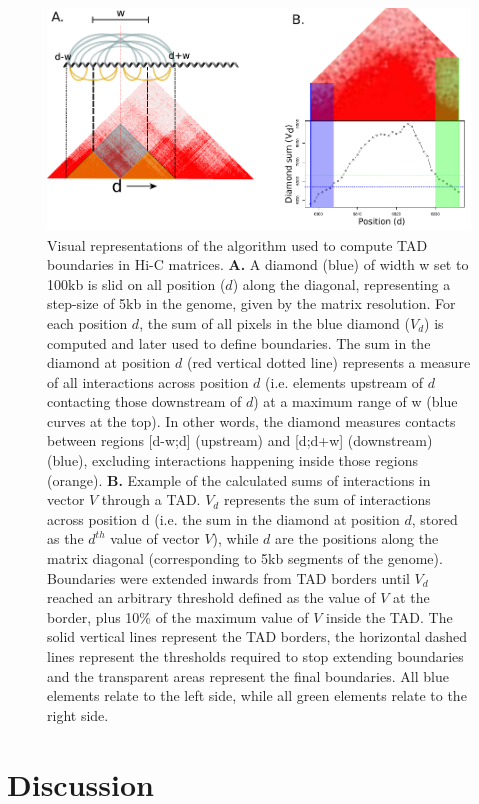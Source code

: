 \documentclass[11pt,a4paper]{report}
\begin{document}
\begin{figure}[ht]
	\includegraphics[width=1\textwidth]{Figures/6_interactions.pdf}
	\caption{Visual representations of the algorithm used to compute TAD boundaries in Hi-C matrices. \textbf{A.} A diamond (blue) of width w set to 100kb is slid on all position ($d$) along the diagonal, representing a step-size of 5kb in the genome, given by the matrix resolution. For each position $d$, the sum of all pixels in the blue diamond ($V_d$) is computed and later used to define boundaries. The sum in the diamond at position $d$ (red vertical dotted line) represents a measure of all interactions across position $d$ (i.e. elements upstream of $d$ contacting those downstream of $d$) at a maximum range of w (blue curves at the top). In other words, the diamond measures contacts between regions [d-w;d] (upstream) and [d;d+w] (downstream) (blue), excluding interactions happening inside those regions (orange). \textbf{B.} Example of the calculated sums of interactions in vector $V$ through a TAD. $V_d$ represents the sum of interactions across position d (i.e. the sum in the diamond at position $d$, stored as the $d^{th}$ value of vector $V$), while $d$ are the positions along the matrix diagonal (corresponding to 5kb segments of the genome). Boundaries were extended inwards from TAD borders until $V_d$ reached an arbitrary threshold defined as the value of $V$ at the border, plus 10\% of the maximum value of $V$ inside the TAD. The solid vertical lines represent the TAD borders, the horizontal dashed lines represent the thresholds required to stop extending boundaries and the transparent areas represent the final boundaries. All blue elements relate to the left side, while all green elements relate to the right side.}
	\label{interact_hic}
\end{figure}


\FloatBarrier
\section*{Discussion}
\end{document}

